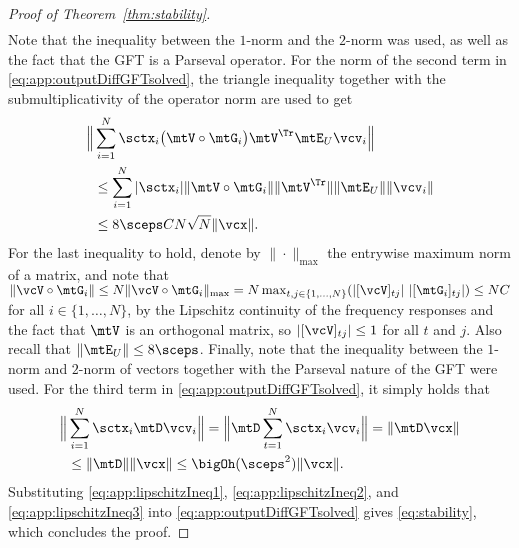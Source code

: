 \begin{proof}[Proof of Theorem~\ref{thm:stability}]
\begin{equation}
\begin{aligned}
\end{aligned}
%
\end{equation}
%
Note that the inequality between the $1$-norm and the $2$-norm was used, as well as the fact that the GFT is a Parseval operator. For the norm of the second term in \eqref{eq:app:outputDiffGFTsolved}, the triangle inequality together with the submultiplicativity of the operator norm are used to get
%
\begin{equation}\label{eq:app:lipschitzIneq2}
%
\begin{aligned}
    \Big\| & \sum_{i=1}^{N} \sctx_{i} \big(\mtV \circ \mtG_{i}\big) \mtV^{\Tr} \mtE_{U} \vcv_{i} \Big\| \\ & \leq \sum_{i=1}^{N} | \sctx_{i} | \| \mtV \circ \mtG_{i} \| \| \mtV^{\Tr} \| \| \mtE_{U}\| \| \vcv_{i}\| \\ & \leq 8\sceps CN\sqrt{N} \| \vcx\|.
\end{aligned}
%
\end{equation}
%
For the last inequality to hold, denote by $\|\cdot\|_{\max}$ the entrywise maximum norm of a matrix, and note that $\|\vcV \circ \mtG_{i} \| \leq N \| \vcV \circ \mtG_{i}\|_{\max} = N \max_{t,j \in \{1,\ldots,N\}} (| [\vcV]_{tj}|\ |[\mtG_{i}]_{tj}| ) \leq NC$ for all $i \in \{1,\ldots,N\}$, by the Lipschitz continuity of the frequency responses and the fact that $\mtV$ is an orthogonal matrix, so $|[\vcV]_{tj}|\le 1$ for all $t$ and $j$. Also recall that $\|\mtE_{U}\| \leq 8 \sceps$. Finally, note that the inequality between the $1$-norm and $2$-norm of vectors together with the Parseval nature of the GFT were used. For the third term in \eqref{eq:app:outputDiffGFTsolved}, it simply holds that
%
\begin{equation}\label{eq:app:lipschitzIneq3}
%
\begin{aligned}
    \Big\| & \sum_{i=1}^{N} \sctx_{i} \mtD \vcv_{i} \Big\| = \Big\| \mtD \sum_{t=1}^{N} \sctx_{i} \vcv_{i} \Big\| = \| \mtD \vcx \| \\ & \leq \| \mtD \| \| \vcx \| \leq \bigOh(\sceps^{2}) \| \vcx\|.
\end{aligned}
%
\end{equation}
%
Substituting \eqref{eq:app:lipschitzIneq1}, \eqref{eq:app:lipschitzIneq2}, and \eqref{eq:app:lipschitzIneq3} into \eqref{eq:app:outputDiffGFTsolved} gives \eqref{eq:stability}, which concludes the proof.
\end{proof}

